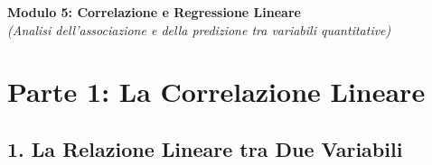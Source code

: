 \documentclass[12pt, a4paper]{article}
\begin{document}
\begin{center}
    \Large\textbf{Modulo 5: Correlazione e Regressione Lineare} \\
    \vspace{0.5cm}
    \large\textit{(Analisi dell'associazione e della predizione tra variabili quantitative)}
\end{center}

\section*{Parte 1: La Correlazione Lineare}

\subsection*{1. La Relazione Lineare tra Due Variabili}
\end{document}
